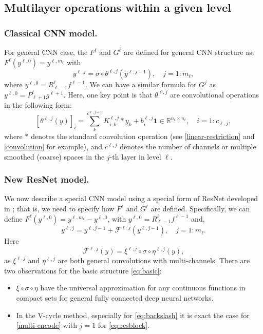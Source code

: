 \subsection{Multilayer operations within a given  level}\label{ssc:layer}

\subsubsection{Classical CNN model.}
For general CNN case, the $F^\ell$ and $G^\ell$ are defined for general CNN structure as: $F^\ell (y^{\ell,0}) = y^{\ell, m_\ell}$ with 
\begin{equation}\label{eq:gcnnblock}
y^{\ell, j} = \sigma \circ \theta^{\ell,j}(y^{\ell,j-1}),
\quad j = 1:m_\ell,
\end{equation}
where $y^{\ell,0} =R^{\ell}_{\ell-1} f^{\ell-1}$. We can have a similar formula for $G^j$ as $y^{\ell,0} =
P^{\ell}_{\ell+1} g^{\ell+1}$.
Here,  one key point is that $\theta^{\ell,j}$
are convolutional operations in the following form:
\begin{equation}\label{eq:conv-1}
[\theta^{\ell,j}(y)]_{i} = \sum_k^{c^{\ell,j-1}}K^{\ell, j}_{i,k} \ast y_k + b^{\ell,j}_i \bm{1} \in \mathbb{R}^{n_\ell \times n_\ell}, \quad i = 1:c_{\ell,j},
\end{equation}
where $\ast$ denotes the standard convolution operation (see
\eqref{linear-restriction} and \eqref{convolution} for example), and
$c^{\ell,j}$ denotes the number of channels or multiple smoothed
(coarse) spaces in the $j$-th layer in level $\ell$.

\subsubsection{New ResNet model.}
We now describe a special CNN model using a special form of ResNet
developed in \cite{he2016deep,he2016identity};  that is,  we need to
specify how $F^\ell$ and $G^\ell$ are defined.  Specifically, we can
define $F^\ell (y^{\ell,0}) = y^{\ell, m_\ell} -  y^{\ell, 0}$, with
$y^{\ell,0} =R^{\ell}_{\ell-1} f^{\ell-1}$ and, 
\begin{equation}\label{eq:resblock}
y^{\ell, j} = y^{\ell, j-1} + \mathcal{F}^{\ell, j}(y^{\ell,j-1}),
\quad j = 1:m_\ell.
\end{equation}
Here
\begin{equation}\label{eq:basic}
\mathcal{F}^{\ell,j}(y) = \xi^{\ell,j} \circ \sigma \circ \eta^{\ell,j}(y),
\end{equation}
as $\xi^{\ell,j}$ and $\eta^{\ell,j}$ are both general convolutions
with multi-channels. There are two observations for the basic structure \eqref{eq:basic}:
\begin{itemize}
	\item $ \xi \circ \sigma \circ \eta$ have the universal approximation for any continuous functions in compact sets for general fully connected deep neural networks.
	\item In the V-cycle method, especially for \eqref{eq:backslash} it is exact the case for \eqref{multi-encode} with $j=1$ for \eqref{eq:resblock}.
\end{itemize}


